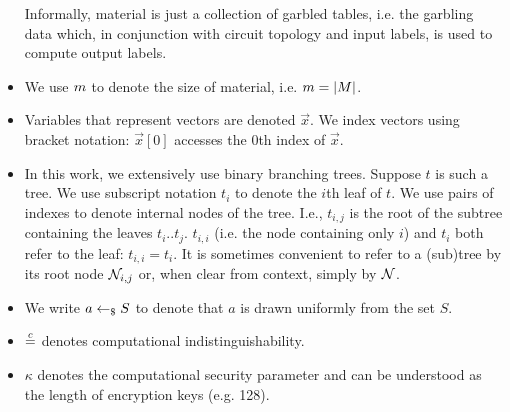 \begin{itemize}
	Informally, material is just a collection of garbled tables, i.e. the garbling data which, in conjunction with circuit topology and input labels, is used to compute output labels.
\item We use $m$ to denote the size of material, i.e. $m =
  |M|$.
	\item Variables that represent vectors are denoted  
	 $\vec{x}$.
	We index vectors using bracket notation: $\vec{x}[0]$ accesses the $0$th index of $\vec{x}$.
\item In this work, we extensively use binary branching trees.
  Suppose $t$ is such a tree. We use subscript notation $t_i$ to denote the
  $i$th leaf of $t$.
  We use pairs of indexes to denote internal nodes of the tree.
  I.e., $t_{i, j}$ is the root of the subtree containing the leaves
  $t_i .. t_j$. $t_{i,i}$ (i.e. the node
  containing only $i$) and $t_i$ both refer to the leaf: $t_{i,i} =
  t_i$.
  It is sometimes convenient to refer to a (sub)tree by its root node
  $\mathtt{\cal N}_{i, j}$ or, when clear from context, simply by $\mathtt{\cal N}$.
	\item We write $a \gets_{\$} S$ to denote that $a$ is drawn
    uniformly from the set $S$.
	\item $\overset{c}{=}$ denotes computational indistinguishability.
	\item $\kappa$ denotes the computational security parameter and can be understood as the length of encryption keys (e.g. 128).
\end{itemize}

